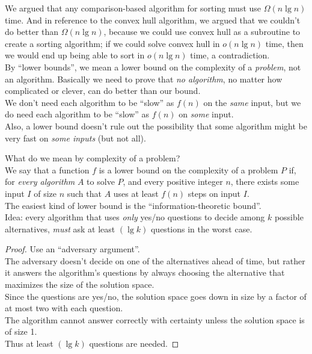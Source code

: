 \documentclass[12pt]{article}
\theoremstyle{plain}
\theoremstyle{definition}
\begin{document}
We argued that any comparison-based algorithm for sorting must use $\Omega(n \lg n)$ time.
And in reference to the convex hull algorithm, we argued that we couldn't do better than $\Omega(n \lg n)$, because we could use convex hull as a subroutine to create a sorting algorithm;
if we could solve convex hull in $o(n \lg n)$ time, then we would end up being able to sort in $o(n \lg n)$ time, a contradiction. \\

By ``lower bounds'', we mean a lower bound on the complexity of a \emph{problem}, not an algorithm.
Basically we need to prove that \emph{no algorithm}, no matter how complicated or clever, can do better than our bound. \\
We don't need each algorithm to be ``slow'' as $f(n)$ on the \emph{same} input, but we do need each algorithm to be ``slow'' as $f(n)$ on \emph{some} input. \\
Also, a lower bound doesn't rule out the possibility that some algorithm might be very fast on \emph{some inputs} (but not all).

What do we mean by complexity of a problem? \\
We say that a function $f$ is a lower bound on the complexity of a problem $P$ if, for \emph{every algorithm} $A$ to solve $P$, and every positive integer $n$, there exists some input $I$ of size $n$ such that $A$ uses at least $f(n)$ steps on input $I$. \\

The easiest kind of lower bound is the ``information-theoretic bound''. \\
Idea: every algorithm that uses \emph{only} yes/no questions to decide among $k$ possible alternatives, \emph{must} ask at least $(\lg k)$ questions in the worst case.
\begin{proof}
Use an ``adversary argument''. \\
The adversary doesn't decide on one of the alternatives ahead of time, but rather it answers the algorithm's questions by always choosing the alternative that maximizes the size of the solution space. \\
Since the questions are yes/no, the solution space goes down in size by a factor of at most two with each question. \\
The algorithm cannot answer correctly with certainty unless the solution space is of size 1. \\
Thus at least $(\lg k)$ questions are needed.
\end{proof}
\end{document}
